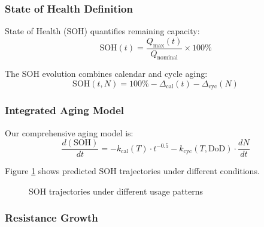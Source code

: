 \subsubsection{State of Health Definition}

State of Health (SOH) quantifies remaining capacity:
\begin{equation}
\text{SOH}(t) = \frac{Q_{\max}(t)}{Q_{\text{nominal}}} \times 100\%
\label{eq:soh_def}
\end{equation}

The SOH evolution combines calendar and cycle aging:
\begin{equation}
\text{SOH}(t, N) = 100\% - \Delta_{\text{cal}}(t) - \Delta_{\text{cyc}}(N)
\label{eq:soh_evolution}
\end{equation}

\subsubsection{Integrated Aging Model}

Our comprehensive aging model is:
\begin{equation}
\frac{d(\text{SOH})}{dt} = -k_{\text{cal}}(T) \cdot t^{-0.5} - k_{\text{cyc}}(T, \text{DoD}) \cdot \frac{dN}{dt}
\label{eq:integrated_aging}
\end{equation}

Figure \ref{fig:soh_trajectory} shows predicted SOH trajectories under different conditions.

\begin{figure}[H]
\centering
{}
\caption{SOH trajectories under different usage patterns}
\label{fig:soh_trajectory}
\end{figure}

\subsubsection{Resistance Growth}

